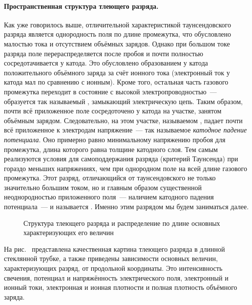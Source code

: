 \paragraph{Пространственная структура тлеющего разряда.}
Как уже говорилось выше, отличительной характеристикой таунсендовского разряда
является однородность поля по длине
промежутка, что обусловлено малостью тока и отсутствием объёмных зарядов. Однако
при большом токе разряда поле
перераспределяется после пробоя и почти полностью сосредотачивается у катода.
Это обусловлено образованием у катода
положительного объёмного заряда за счёт ионного тока (электронный ток у катода
мал по сравнению с ионным). Кроме того,
остальная часть газового промежутка переходит в состояние с высокой
электропроводностью~--- образуется так называемый
, замыкающий электрическую цепь. Таким образом, почти всё
приложенное поле сосредоточено у катода на
участке, занятом объёмным зарядом. Следовательно, на этом участке, называемом
, падает почти всё
приложенное к электродам напряжение~--- так называемое
\emph{катодное падение потенциала}. Оно примерно равно минимальному
напряжению пробоя для промежутка, длина которого равна толщине катодного слоя.
Тем самым реализуются условия для
самоподдержания разряда (критерий Таунсенда) при гораздо меньших напряжениях,
чем при однородном поле на всей длине
газового промежутка. Этот разряд, отличающийся от таунсендовского не только
значительно большим током, но и главным
образом существенной неоднородностью приложенного поля~--- наличием катодного
падения потенциала~--- и называется
. Именно этим разрядом мы будем заниматься далее.

\begin{figure}[h!]
	\centering
	\caption{Структура тлеющего разряда и распределение по длине основных
характеризующих его величин}
\end{figure}

На рис.~ представлена качественная картина тлеющего
разряда в длинной стеклянной трубке, а также приведены зависимости
основных величин, характеризующих разряд, от продольной координаты. Это
интенсивность свечения, потенциал и
напряжённость электрического поля, электронный и ионный токи, электронная и
ионная плотности и полная плотность
объёмного заряда.

